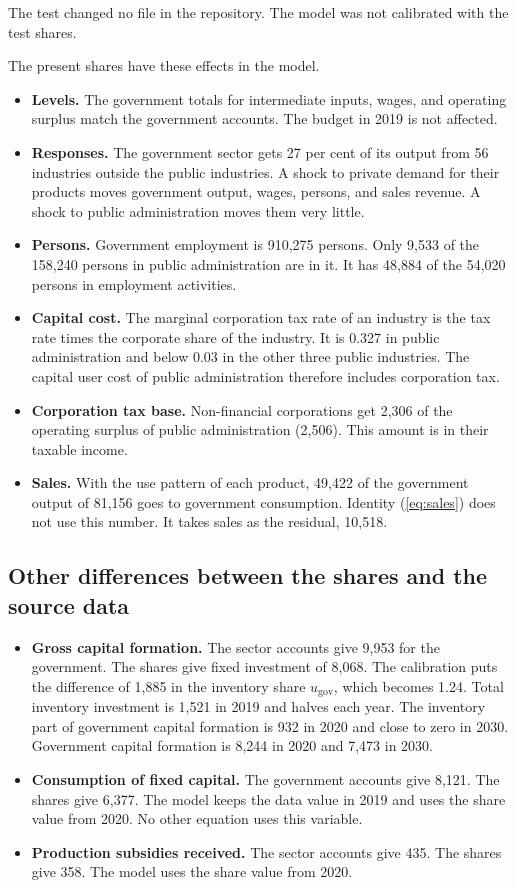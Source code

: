 \documentclass[11pt,a4paper]{article}
\newcommand{\gov}{\mathrm{gov}}
\begin{document}
The test changed no file in the repository. The model was not calibrated with the test shares.

The present shares have these effects in the model.
\begin{itemize}
\item \textbf{Levels.} The government totals for intermediate inputs, wages, and operating surplus match the government accounts. The budget in 2019 is not affected.
\item \textbf{Responses.} The government sector gets 27 per cent of its output from 56 industries outside the public industries. A shock to private demand for their products moves government output, wages, persons, and sales revenue. A shock to public administration moves them very little.
\item \textbf{Persons.} Government employment is 910,275 persons. Only 9,533 of the 158,240 persons in public administration are in it. It has 48,884 of the 54,020 persons in employment activities.
\item \textbf{Capital cost.} The marginal corporation tax rate of an industry is the tax rate times the corporate share of the industry. It is 0.327 in public administration and below 0.03 in the other three public industries. The capital user cost of public administration therefore includes corporation tax.
\item \textbf{Corporation tax base.} Non-financial corporations get 2,306 of the operating surplus of public administration (2,506). This amount is in their taxable income.
\item \textbf{Sales.} With the use pattern of each product, 49,422 of the government output of 81,156 goes to government consumption. Identity (\ref{eq:sales}) does not use this number. It takes sales as the residual, 10,518.
\end{itemize}

\subsection{Other differences between the shares and the source data}

\begin{itemize}
\item \textbf{Gross capital formation.} The sector accounts give 9,953 for the government. The shares give fixed investment of 8,068. The calibration puts the difference of 1,885 in the inventory share $u_{\gov}$, which becomes 1.24. Total inventory investment is 1,521 in 2019 and halves each year. The inventory part of government capital formation is 932 in 2020 and close to zero in 2030. Government capital formation is 8,244 in 2020 and 7,473 in 2030.
\item \textbf{Consumption of fixed capital.} The government accounts give 8,121. The shares give 6,377. The model keeps the data value in 2019 and uses the share value from 2020. No other equation uses this variable.
\item \textbf{Production subsidies received.} The sector accounts give 435. The shares give 358. The model uses the share value from 2020.
\end{itemize}
\end{document}

